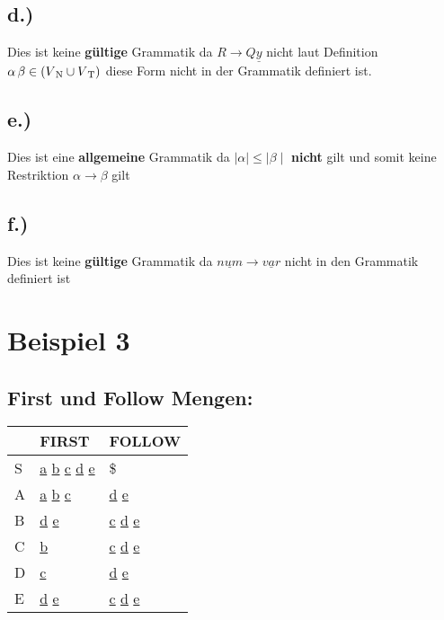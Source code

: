 \documentclass[12pt,runningheads,a4paper]{llncs}
\begin{document}
\subsection*{d.)}
Dies ist keine \textbf{gültige} Grammatik da $R \rightarrow Q\underline{y} $ nicht laut Definition $\alpha \, \beta \in (V\textsubscript{N} \cup V\textsubscript{T})$ diese Form nicht in der Grammatik definiert ist.
\subsection*{e.)}
Dies ist eine \textbf{allgemeine} Grammatik da $ \mid\alpha\mid \leq \mid\beta\mid$ \textbf{nicht} gilt und somit keine Restriktion $\alpha \rightarrow \beta$  gilt 
\subsection*{f.)}
Dies ist keine \textbf{gültige} Grammatik da $\underline{num} \rightarrow      \underline{var}$ nicht in den Grammatik definiert ist



\section*{Beispiel 3}
\subsection*{First und Follow Mengen:}

\begin{table}[htbp]
    \centering
      \begin{tabular}{|m{1cm}|m{2cm}|m{2cm}|}
\hline
 &FIRST & FOLLOW \\ \hline
S & \underline{a} \underline{b} \underline{c} \underline{d} \underline{e} & \$ \\ \hline
A & \underline{a}  \underline{b} \underline{c} &  \underline{d} \underline{e} \\ \hline
B & \underline{d} \underline{e} & \underline{c} \underline{d} \underline{e}\\ \hline
C & \underline{b}  & \underline{c} \underline{d} \underline{e} \\ \hline
D & \underline{c} & \underline{d} \underline{e} \\ \hline
E & \underline{d} \underline{e} & \underline{c} \underline{d} \underline{e}\\ 
\hline
        \end{tabular}
\end{table}
\end{document}

